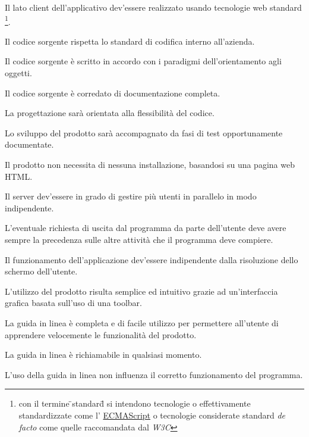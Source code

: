 \begin{elenconumerato}{\subsubsecindent}
\item Il lato client dell'applicativo dev'essere realizzato usando tecnologie web standard
\footnote{con il termine \"{}standard\" {} si intendono tecnologie o effettivamente standardizzate come l'
\underline{ECMAScript} o tecnologie considerate standard \textit{de facto} come quelle raccomandata dal \textit{W3C}}.
\item Il codice sorgente rispetta lo standard di codifica interno all'azienda.
\item Il codice sorgente \`e scritto in accordo con i paradigmi dell'orientamento agli oggetti.
\item Il codice sorgente \`e corredato di documentazione completa.
\item La progettazione sar\`a orientata alla flessibilit\`a del codice.
\item Lo sviluppo del prodotto sar\`a accompagnato da fasi di test opportunamente documentate.
\item Il prodotto non necessita di nessuna installazione, basandosi su una pagina web HTML.
\item Il server dev'essere in grado di gestire pi\`u utenti in parallelo in modo indipendente.
\item L'eventuale richiesta di uscita dal programma da parte dell'utente deve avere sempre la precedenza sulle altre attivit\`a che il programma deve compiere.
\item Il funzionamento dell'applicazione dev'essere indipendente dalla risoluzione dello schermo dell'utente.
\end{elenconumerato}



\begin{elenconumerato}{\subsubsecindent}
\item L'utilizzo del prodotto risulta semplice ed intuitivo grazie ad un'interfaccia grafica basata sull'uso di una toolbar.
\item La guida in linea \`e completa e di facile utilizzo per permettere all'utente di apprendere velocemente le funzionalit\`a del prodotto.
\item La guida in linea \`e richiamabile in qualsiasi momento.
\item L'uso della guida in linea non influenza il corretto funzionamento del programma. 
\end{elenconumerato}

